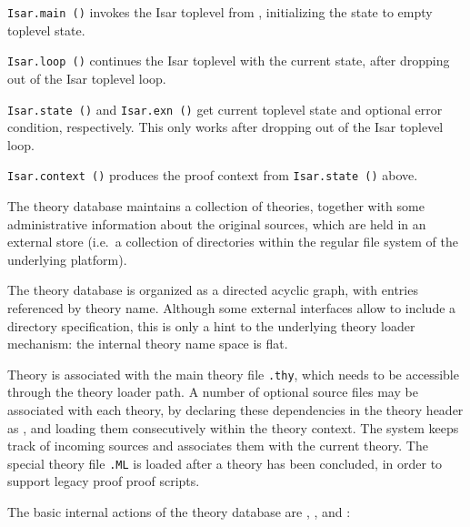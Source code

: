\begin{isabellebody}
\begin{isamarkuptext}
  \begin{description}

  \item \verb|Isar.main ()| invokes the Isar toplevel from {\ML},
  initializing the state to empty toplevel state.

  \item \verb|Isar.loop ()| continues the Isar toplevel with the
  current state, after dropping out of the Isar toplevel loop.

  \item \verb|Isar.state ()| and \verb|Isar.exn ()| get current
  toplevel state and optional error condition, respectively.  This
  only works after dropping out of the Isar toplevel loop.

  \item \verb|Isar.context ()| produces the proof context from \verb|Isar.state ()| above.

  \end{description}%
\end{isamarkuptext}%
\isamarkuptrue%
%
\endisatagmlref
{\isafoldmlref}%
%
\isadelimmlref
%
\endisadelimmlref
%
\isamarkuptrue%
%
\begin{isamarkuptext}%
The theory database maintains a collection of theories,
  together with some administrative information about the original
  sources, which are held in an external store (i.e.\ a collection of
  directories within the regular file system of the underlying
  platform).

  The theory database is organized as a directed acyclic graph, with
  entries referenced by theory name.  Although some external
  interfaces allow to include a directory specification, this is only
  a hint to the underlying theory loader mechanism: the internal
  theory name space is flat.

  Theory  is associated with the main theory file \verb,.thy,, which needs to be accessible through the theory
  loader path.  A number of optional {\ML} source files may be
  associated with each theory, by declaring these dependencies in the
  theory header as \isa{{\isasymUSES}}, and loading them consecutively
  within the theory context.  The system keeps track of incoming {\ML}
  sources and associates them with the current theory.  The special
  theory {\ML} file \verb,.ML, is loaded after a theory has
  been concluded, in order to support legacy proof {\ML} proof
  scripts.

  The basic internal actions of the theory database are , , and :


\end{isamarkuptext}
\end{isabellebody}
